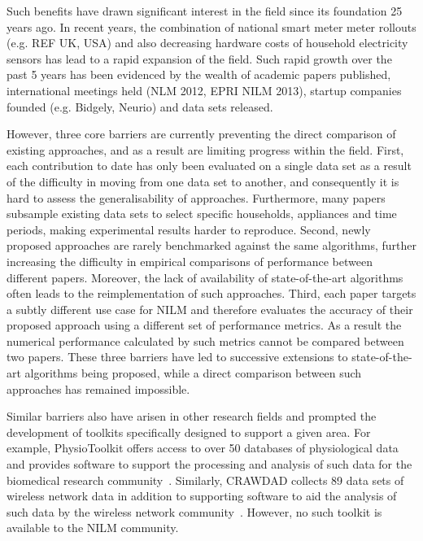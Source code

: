 \documentclass{sig-alternate}
\begin{document}
Such benefits have drawn significant interest in the field since its foundation 25 years ago. In recent years, the combination of national smart meter meter rollouts (e.g. REF UK, USA) and also decreasing hardware costs of household electricity sensors has lead to a rapid expansion of the field. Such rapid growth over the past 5 years has been evidenced by the wealth of academic papers published, international meetings held (NLM 2012, EPRI NILM 2013), startup companies founded (e.g. Bidgely, Neurio) and data sets released.

However, three core barriers are currently preventing the direct comparison of existing approaches, and as a result are limiting progress within the field. First, each contribution to date has only been evaluated on a single data set as a result of the difficulty in moving from one data set to another, and consequently it is hard to assess the generalisability of approaches. Furthermore, many papers subsample existing data sets to select specific households, appliances and time periods, making experimental results harder to reproduce. Second, newly proposed approaches are rarely benchmarked against the same algorithms, further increasing the difficulty in empirical comparisons of performance between different papers. Moreover, the lack of availability of state-of-the-art algorithms often leads to the reimplementation of such approaches. Third, each paper targets a subtly different use case for NILM and therefore evaluates the accuracy of their proposed approach using a different set of performance metrics. As a result the numerical performance calculated by such metrics cannot be compared between two papers. These three barriers have led to successive extensions to state-of-the-art algorithms being proposed, while a direct comparison between such approaches has remained impossible.

Similar barriers also have arisen in other research fields and prompted the development of toolkits specifically designed to support a given area. For example, PhysioToolkit offers access to over 50 databases of physiological data and provides software to support the processing and analysis of such data for the biomedical research community~\cite{physionet}. Similarly, CRAWDAD collects 89 data sets of wireless network data in addition to supporting software to aid the analysis of such data by the wireless network community~\cite{crawdad}. However, no such toolkit is available to the NILM community.
\end{document}

